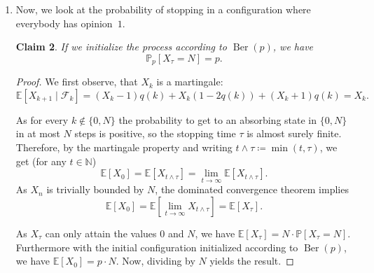 \documentclass[a4paper]{amsart}
\DeclareMathOperator{\Ber}{Ber}
\theoremstyle{theorem}
\newtheorem{claim}{Claim}
\theoremstyle{definition}
\newcommand{\N}{\mathbb{N}}
\newcommand{\E}{\mathbb{E}}
\renewcommand{\P}{\mathbb{P}}
\begin{document}
\begin{enumerate}[label=\alph*)]
	\begin{claim}
		We can bound the expected stopping time by $$\max_k\E_k[\tau] \leq (N-1)^2.$$
	\end{claim}
	\begin{proof}
		By Claim 6, we can compute
		\begin{align*}
			\E_k[\tau]
			&= (N-1)\left( \sum_{i=k}^{N-1} \frac{k}{i} + \sum_{i=N-k+1}^{N-1} \frac{N-k}{i} \right) \\
			&\leq (N-1)\Big( (N-1 - k + 1) + (N-1 - (N-k+1) + 1) \Big)\\
			&=(N-1)(N-k + k - 1) = (N-1)^2
		\end{align*}
	\end{proof}
	
	
	\item Now, we look at the probability of stopping in a configuration where everybody has opinion~$1$.
	
	\begin{claim}
	If we initialize the process according to $\Ber(p)$, we have
		$$\P_p[X_\tau = N] = p.$$
	\end{claim}
	\begin{proof}
		We first observe, that $X_k$ is a martingale:
		$$ \E[X_{k+1}\mid \mathcal{F}_k] = (X_k-1)q(k) + X_k(1-2 q(k)) + (X_k + 1)q(k) = X_k. $$
		
		As for every $k\notin\{0,N\}$ the probability to get to an absorbing state in $\{0, N\}$ in at most $N$ steps is positive, so the stopping time $\tau$ is almost surely finite.
		Therefore, by the martingale property and writing $t\land \tau\coloneqq \min(t,\tau)$, we get (for any $t\in\N$) $$\E [X_0] = \E [X_{t\land \tau}] = \lim_{t\to\infty} \E[X_{t\land\tau}].$$
		As $X_n$ is trivially bounded by $N$, the dominated convergence theorem implies
		$$\E[X_0] = \E[\lim_{t\to\infty} X_{t\land \tau}] = \E[X_\tau].$$ 
		
		As $X_\tau$ can only attain the values $0$ and $N$, we have $\E[X_\tau] = N\cdot \P[X_\tau = N]$.
		Furthermore with the initial configuration initialized according to $\Ber(p)$, we have $\E[X_0] = p\cdot N$.
		Now, dividing by $N$ yields the result.
	\end{proof}
	

\end{enumerate}
\end{document}

